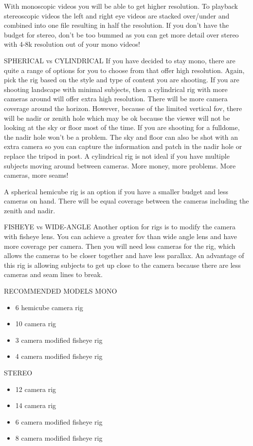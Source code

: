 \begin{fullwidth}
{With monoscopic videos you will be able to get higher resolution. To playback stereoscopic videos the left and right eye videos are stacked over/under and combined into one file resulting in half the resolution. If you don’t have the budget for stereo, don’t be too bummed as you can get more detail over stereo with 4-8k resolution out of your mono videos!

SPHERICAL vs CYLINDRICAL
If you have decided to stay mono, there are quite a range of options for you to choose from that offer high resolution. Again, pick the rig based on the style and type of content you are shooting. If you are shooting landscape with minimal subjects, then a cylindrical rig with more cameras around will offer extra high resolution. There will be more camera coverage around the horizon. However, because of the limited vertical fov, there will be nadir or zenith hole which may be ok because the viewer will not be looking at the sky or floor most of the time. If you are shooting for a fulldome, the nadir hole won’t be a problem. The sky and floor can also be shot with an extra camera so you can capture the information and patch in the nadir hole or replace the tripod in post. A cylindrical rig is not ideal if you have multiple subjects moving around between cameras. More money, more problems. More cameras, more seams!

A spherical hemicube rig is an option if you have a smaller budget and less cameras on hand. There will be equal coverage between the cameras including the zenith and nadir. 

FISHEYE vs WIDE-ANGLE
Another option for rigs is to modify the camera with fisheye lens. You can achieve a greater fov than wide angle lens and have more coverage per camera. Then you will need less cameras for the rig, which allows the cameras to be closer together and have less parallax. An advantage of this rig is allowing subjects to get up close to the camera because there are less cameras and seam lines to break. 

RECOMMENDED MODELS
MONO 
\begin{itemize}
\item 6 hemicube camera rig
\item 10 camera rig
\item 3 camera modified fisheye rig
\item 4 camera modified fisheye rig 

\end{itemize}

STEREO 
\begin{itemize}
\item 12 camera rig
\item 14 camera rig
\item 6 camera modified fisheye rig
\item 8 camera modified fisheye rig



\end{itemize}}
\end{fullwidth}
